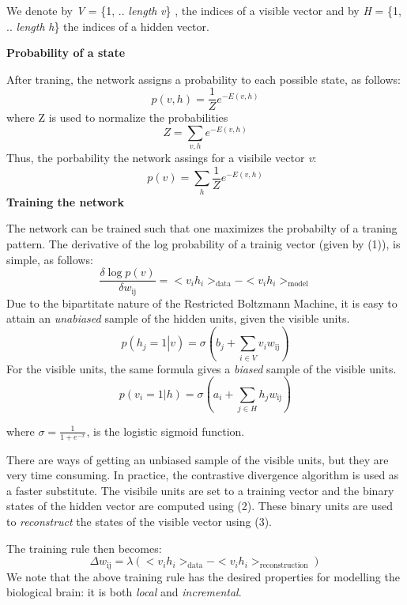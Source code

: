 \documentclass{letter}
\newcommand{\noplus}{}
\newcommand{\tmop}[1]{\ensuremath{\operatorname{#1}}}
\newcommand{\tmtextbf}[1]{{\bfseries{#1}}}
\newcommand{\tmtextit}[1]{{\itshape{#1}}}
\begin{document}
We denote by \tmtextit{V} = \{1, .. \tmtextit{length} \tmtextit{v}\} , the
indices of a visible vector and by \tmtextit{H} = \{1, .. \tmtextit{length}
\tmtextit{h}\} the indices of a hidden vector.



\tmtextbf{Probability of a state}

After traning, the network assigns a probability to each possible state, as
follows:
\[ p \left( v, h \right) = \frac{1}{Z} e^{- E \left( v, h \right)} \]
where Z is used to normalize the probabilities
\[ Z = \sum_{v, h} e^{- E \left( v, h \right)} \]
Thus, the porbability the network assings for a visibile vector \tmtextit{v}:
\begin{equation}
  p \left( v \right) = \sum_h \frac{1}{Z} e^{- E \left( v, h \right)}
\end{equation}
\tmtextbf{Training the network}

The network can be trained such that one maximizes the probabilty of a traning
pattern. The derivative of the log probability of a trainig vector (given by
(1)), is simple, as follows:
\[ \frac{\delta \log p \left( v \right)}{\delta w_{\tmop{ij}}} = < v_i h_i
   >_{\tmop{data}} - < v_i h_i >_{\tmop{model}} \]
Due to the bipartitate nature of the Restricted Boltzmann Machine, it is easy
to attain an \tmtextit{unabiased} sample of the hidden units, given the
visible units.
\begin{equation}
  p \left( h_j = 1 \left|  \right. v \right) = \sigma \left( b_j + \sum_{i \in
  V} v_i w_{\tmop{ij}} \right)
\end{equation}
For the visible units, the same formula gives a \tmtextit{biased} sample of
the visible units.
\begin{equation}
  p \left( v_i = 1 \left|  \right. h \right) = \sigma \left( a_i + \sum_{j \in
  H} h_j w_{\tmop{ij}} \right)
\end{equation}


where $\sigma = \frac{1}{1 \noplus + e^{- x}}^{}$, is the logistic sigmoid
function.

There are ways of getting an unbiased sample of the visible units, but they
are very time consuming. In practice, the contrastive divergence algorithm is
used as a faster substitute. The visibile units are set to a training vector
and the binary states of the hidden vector are computed using (2). These
binary units are used to \tmtextit{reconstruct} the states of the visible
vector using (3).

The training rule then becomes:
\[ \Delta w_{\tmop{ij}} = \lambda \left( < v_i h_i >_{\tmop{data}} - < v_i h_i
   >_{\tmop{reconstruction}} \right) \]
We note that the above training rule has the desired properties for modelling
the biological brain: it is both \tmtextit{local} and \tmtextit{incremental}.
\end{document}
